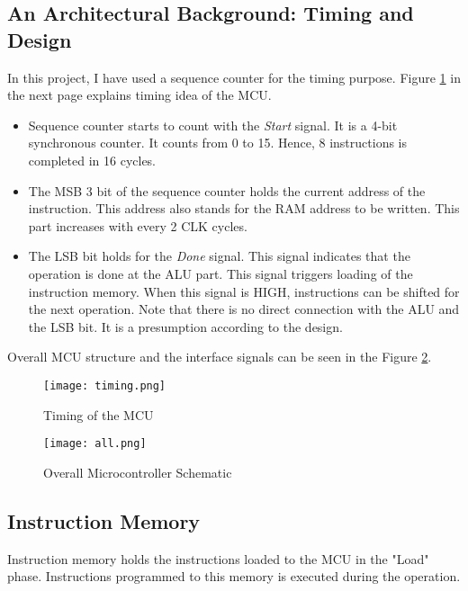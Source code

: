 \documentclass[12pt]{article}
\begin{document}
\subsection*{An Architectural Background: Timing and Design}

In this project, I have used a sequence counter for the timing purpose. Figure \ref{timing} in the next page explains timing idea of the MCU.

\begin{itemize}
\item Sequence counter starts to count with the \textsl{Start} signal. It is a 4-bit synchronous counter. It counts from 0 to 15. Hence, 8 instructions is completed in 16 cycles.

\item The MSB 3 bit of the sequence counter holds the current address of the instruction. This address also stands for the RAM address to be written. This part increases with every 2 CLK cycles.

\item  The LSB bit holds for the \textsl{Done} signal. This signal indicates that the operation is done at the ALU part. This signal triggers loading of the instruction memory. When this signal is HIGH, instructions can be shifted for the next operation. Note that there is no direct connection with the ALU and the LSB bit. It is a presumption according to the design.

\end{itemize}

Overall MCU structure and the interface signals can be seen in the Figure \ref{all}.

\begin{landscape}
\pagestyle{empty}
\begin{figure}[H]
\centering
\texttt{[image: timing.png]}
\caption{Timing of the MCU}
\label{timing}
\end{figure}




\begin{figure}[H]
\centering
\texttt{[image: all.png]}
\caption{Overall Microcontroller Schematic}
\label{all}
\end{figure}

\end{landscape}
\newpage
\subsection*{Instruction Memory}
Instruction memory holds the instructions loaded to the MCU in the "Load" phase. Instructions programmed to this memory is executed during the operation. \\
\end{document}
